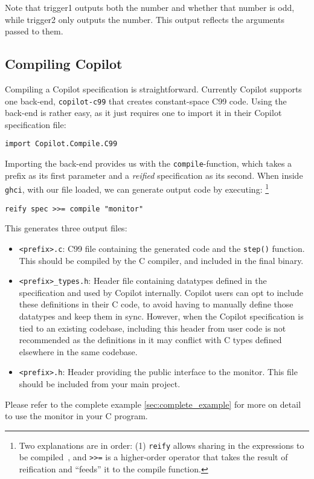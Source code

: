 Note that trigger1 outputs both the number and whether that number is odd,
while trigger2 only outputs the number. This output reflects the arguments
	passed to them. 

\subsection{Compiling Copilot} \label{sec:compiling}

Compiling a Copilot specification is straightforward. Currently Copilot
supports one back-end, \texttt{copilot-c99} that creates constant-space C99
code. Using the back-end is rather easy, as it just requires one to import it in
their Copilot specification file:

\begin{lstlisting}[language = Copilot]
import Copilot.Compile.C99
\end{lstlisting}

Importing the back-end provides us with the \texttt{compile}-function, which
takes a prefix as its first parameter and a \textit{reified} specification as
its second. When inside \texttt{ghci}, with our file loaded, we can generate
output code by executing:
\footnote{Two explanations are in order: (1) {\tt reify} allows sharing in the
expressions to be compiled~\cite{DSLExtract}, and {\tt >>=} is a higher-order
operator that takes the result of reification and ``feeds'' it to the compile
function.}
\begin{lstlisting}[language = Copilot]
reify spec >>= compile "monitor"
\end{lstlisting}

This generates three output files:
\begin{itemize}
  \item \texttt{<prefix>.c}: C99 file containing the generated code and the
  \texttt{step()} function. This should be compiled by the C compiler, and
  included in the final binary.
  \item \texttt{<prefix>\_types.h}: Header file containing datatypes defined in the specification and used by Copilot internally. Copilot users can opt to include these definitions in their C code, to avoid having to manually define those datatypes and keep them in sync. However, when the Copilot specification is tied to an existing codebase, including this header from user code is not recommended as the definitions in it may conflict with C types defined elsewhere in the same codebase.
 \item \texttt{<prefix>.h}: Header providing the public interface to the
  monitor. This file should be included from your main project.
\end{itemize}

Please refer to the complete example \ref{sec:complete_example} for more on
detail to use the monitor in your C program.
